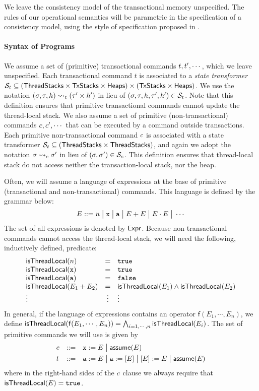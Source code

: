 \documentclass[a4paper,UKenglish]{article}%
\theoremstyle{plain}
\begin{document}
We leave the consistency model of the transactional memory unspecified. The rules 
of our operational semantics will be parametric in the specification of a consistency 
model, using the style of specification proposed in \cite{laws}. 

\paragraph{\textbf{Syntax of Programs}}
We assume a set of (primitive) transactional commands $t,t',\cdots$, which 
we leave unspecified. Each transactional command $t$ is associated to a \emph{state transformer} 
$\mathcal{S}_t \subseteq (\mathsf{ThreadStacks} \times \mathsf{TxStacks} \times \mathsf{Heaps}) \times (\mathsf{TxStacks} \times \mathsf{Heaps})$. 
We use the notation $(\sigma, \tau, h) \rightsquigarrow_t (\tau' \times h')$ 
in lieu of $(\sigma, \tau, h, \tau', h') \in \mathcal{S}_t$. Note that this definition ensures 
that primitive transactional commands cannot update the thread-local stack.
We also assume a set of primitive (non-transactional) commands $c, c',\cdots$ 
that can be executed by a command outside transactions. Each primitive non-transactional 
command $c$ is associated with a state transformer $\mathcal{S}_t \subseteq 
(\mathsf{ThreadStacks} \times \mathsf{ThreadStacks})$, and again we adopt the notation $\sigma \rightsquigarrow_c 
\sigma'$ in lieu of $(\sigma, \sigma') \in \mathcal{S}_c$. This definition ensures that 
thread-local stack do not access neither the transaction-local stack, nor the heap.

Often, we will assume a language of expressions at the base of primitive (transactional and non-transactional) 
commands. This language is defined by the grammar below: 
\[
E ::= n \;\big\lvert\; \mathtt{x} \;\big\lvert\; \mathtt{a} \;\big\lvert\; E + E \;\big\lvert\; E \cdot E \;\big\lvert\; \cdots
\]
The set of all expressions is denoted by $\mathsf{Expr}$.
Because non-transactional commands cannot access the thread-local stack, we will 
need the following, inductively defined, predicate: 
\[
\begin{array}{lcl}
\mathsf{isThreadLocal}(n) &=& \mathtt{true}\\
\mathsf{isThreadLocal}(\mathtt{x}) &=& \mathtt{true}\\
\mathsf{isThreadLocal}(\mathtt{a}) &=& \mathtt{false}\\
\mathsf{isThreadLocal}(E_1 + E_2) &=& \mathsf{isThreadLocal}(E_1) \wedge \mathsf{isThreadLocal}(E_2)\\
\vdots & \vdots & \vdots
\end{array}
\]
In general, if the language of expressions contains an operator $\mathsf{f}(E_1, \cdots, E_n)$, 
we define $\mathsf{isThreadLocal}(\mathsf{f}(E_1, \cdots, E_n)) = \bigwedge_{i=1,\cdots,n} \mathsf{isThreadLocal}(E_i)$.
The set of primitive commands we will use is given by 
\[
\begin{array}{lcl}
c &::=& \mathtt{x} := E \;\big\lvert\; \mathsf{assume}(E)\\[4pt]
t &::=& \mathtt{a} := E \;\big\lvert\; \mathtt{a} := [E] \;\big\lvert\; [E] := E \;\big\lvert\; \mathsf{assume}(E)
\end{array}
\]
where in the right-hand sides of the $c$ clause we always require that $\mathsf{isThreadLocal}(E) = \mathtt{true}$.
\end{document}
